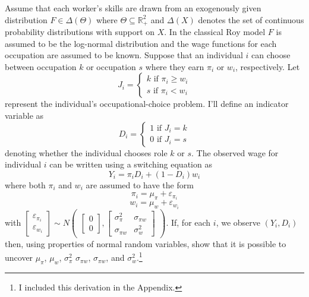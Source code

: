 \documentclass[12 pt]{article}
\begin{document}
Assume that each worker's skills are drawn from an exogenously given distribution $F\in \Delta(\Theta)$ where $\Theta \subseteq \mathbb{R}_+^2$ and $\Delta(X)$ denotes the set of continuous probability distributions with support on $X$. In the classical Roy model $F$ is assumed to be the log-normal distribution and the wage functions for each occupation are assumed to be known. Suppose that an individual $i$ can choose between occupation $k$ or occupation $s$ where they earn $\pi_i$ or $w_i$, respectively. Let 
\begin{equation}
	J_i =
	\begin{cases}
		k \text{ if } \pi_i \geq w_i\\
		s \text{ if } \pi_i < w_i
	\end{cases}
	\label{eqn:occ_choice}
\end{equation}
represent the individual's occupational-choice problem. I'll define an indicator variable as 
\begin{equation*}
	D_i =
	\begin{cases}
		1 \text{ if } J_i=k\\
		0 \text{ if } J_i=s
	\end{cases}
\end{equation*}
denoting whether the individual chooses role $k$ or $s$. The observed wage for individual $i$ can be written using a switching equation as
\begin{equation*}
	Y_i = \pi_i D_i + (1-D_i) w_i
\end{equation*}
where both $\pi_i$ and $w_i$ are assumed to have the form
\begin{equation}
	\pi_i = \mu_\pi + \varepsilon_{\pi_i}
	\label{eqn:pi_simple}
\end{equation}
\begin{equation}
	w_i = \mu_w + \varepsilon_{w_i}
	\label{eqn:w_simple}
\end{equation}
with $\begin{bmatrix}
	\varepsilon_{\pi_i}\\
	 \varepsilon_{w_i}
\end{bmatrix} \sim N \begin{pmatrix}
\begin{bmatrix}
0\\
0
\end{bmatrix},
\begin{bmatrix}
	\sigma_\pi^2 & \sigma_{\pi w}\\
	\sigma_{\pi w} & \sigma_w^2 
\end{bmatrix}
\end{pmatrix}$. If, for each $i$, we observe $(Y_i,D_i)$ then, using properties of normal random variables, \citet{heckman1990empirical} show that it is possible to uncover $\mu_\pi$, $\mu_w$, $\sigma_\pi^2$ $\sigma_{\pi w}$, $\sigma_{\pi w}$, and $\sigma_w^2$.\footnote{I included this derivation in the Appendix.}
\end{document}
